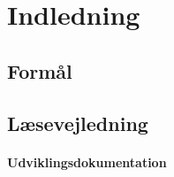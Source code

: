\chapter{Indledning}
\section{Formål}

\section{Læsevejledning}

\subsubsection{Udviklingsdokumentation}
